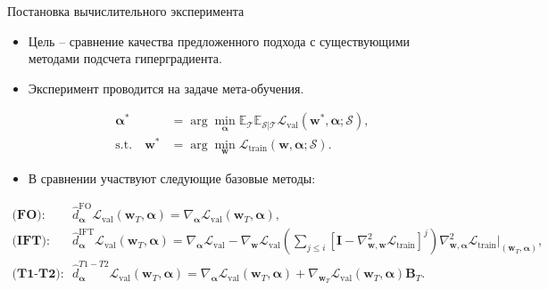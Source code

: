 \documentclass[aspectratio=169]{beamer}
\def\ltrn{\mathcal{L}_{\mathrm{train}}}
\def\lval{\mathcal{L}_{\mathrm{val}}}
\newcommand{\vect}[1]{\boldsymbol{\mathbf{#1}}}
\begin{document}
\begin{frame}{Постановка вычислительного эксперимента}
  \begin{itemize}
    \item Цель -- сравнение качества предложенного подхода с существующими методами подсчета гиперградиента.
    \item Эксперимент проводится на задаче мета-обучения.
    \begin{minipage}{0.49\textwidth}
    \begin{align*}
      \vect{\alpha}^* &= \arg\min_{\vect{\alpha}}\mathbb{E}_{\mathcal{T}}\mathbb{E}_{\mathcal{S}|\mathcal{T}}\lval(\vect{w}^*, \vect{\alpha}; \mathcal{S}),\\
      \mathrm{s.t.} \quad \vect{w}^* &= \arg\min_{\vect{w}}\ltrn(\vect{w}, \vect{\alpha};\mathcal{S}).
    \end{align*}
    \end{minipage}%
    \begin{minipage}{0.49\textwidth}
      \centering
    \end{minipage}
    \item В сравнении участвуют следующие базовые методы:
  \end{itemize}
  \begin{small}
  \begin{align*}
    \textbf{(FO)}: \quad &
    \hat{d}_{\vect{\alpha}}^\text{FO}\lval(\vect{w}_T, \vect{\alpha}) = \nabla_{\vect{\alpha}}\lval(\vect{w}_T, \vect{\alpha}),\\
    \textbf{(IFT)}: \quad &
    \hat{d}_{\vect{\alpha}}^\text{IFT}\lval(\vect{w}_T, \vect{\alpha}) =
    \nabla_{\vect{\alpha}}\lval - \nabla_{\vect{w}}\lval\left(\sum_{j\leq i}\left[\vect{I} - \nabla^2_{\vect{w},\vect{w}}\ltrn\right]^j\right)\nabla^2_{\vect{w},\vect{\alpha}}\ltrn\bigg\vert_{(\vect{w}_T, \vect{\alpha})},\\
    \textbf{(T1-T2)}: \quad &\hat{d}_{\vect{\alpha}}^{T1-T2}\lval(\vect{w}_T, \vect{\alpha}) = \nabla_{\vect{\alpha}}\lval(\vect{w}_T, \vect{\alpha}) + \nabla_{\vect{w}_T}\lval(\vect{w}_T, \vect{\alpha})\vect{B}_T.
  \end{align*}
  \end{small}

  
\end{frame}
\end{document}

